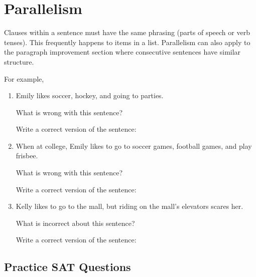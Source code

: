 \section{Parallelism}

Clauses within a sentence must have the same phrasing (parts of speech or verb tenses). This
frequently happens to items in a list. Parallelism can also apply to the paragraph improvement
section where consecutive sentences have similar structure.

\bigskip
For example,
\begin{enumerate}

\item Emily likes soccer, hockey, and going to parties. 

What is wrong with this sentence? 

\hrulefill

Write a correct version of the sentence:

\hrulefill
\item When at college, Emily likes to go to soccer games, football games, and play frisbee. 

What
is wrong with this sentence?

\hrulefill

Write a correct version of the sentence:

\hrulefill
\item Kelly likes to go to the mall, but riding on the mall's elevators scares her. 

What is incorrect about this sentence?

\hrulefill

Write a correct version of the sentence:

\hrulefill
\end{enumerate}

\subsection{Practice SAT Questions}

